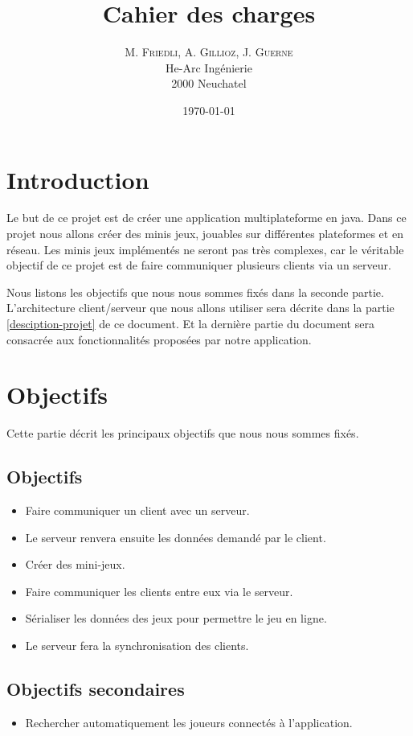 \documentclass{report}
\title{Cahier des charges}
\author{M. \textsc{Friedli}, A. \textsc{Gillioz}, J. \textsc{Guerne}\\
He-Arc Ingénierie\\
2000 Neuchatel}
\date{\today{}}
\begin{document}
\maketitle{}
\chapter{Introduction}
Le but de ce projet est de créer une application multiplateforme en java. Dans ce projet nous allons créer des minis jeux, jouables sur différentes plateformes et en réseau. Les minis jeux implémentés
ne seront pas très complexes, car le véritable objectif de ce projet est de faire communiquer plusieurs clients via un serveur.\par
Nous listons les objectifs que nous nous sommes fixés dans la seconde partie. L'architecture client/serveur que nous allons utiliser sera décrite dans la partie \ref{desciption-projet} de ce document.
Et la dernière partie du document sera consacrée aux fonctionnalités proposées par notre application.
\chapter{Objectifs}
Cette partie décrit les principaux objectifs que nous nous sommes fixés.
\section{Objectifs}\label{objectifs}
\begin{itemize}
	\item Faire communiquer un client avec un serveur.
	\item Le serveur renvera ensuite les données demandé par le client.
	\item Créer des mini-jeux.
	\item Faire communiquer les clients entre eux via le serveur.
	\item Sérialiser les données des jeux pour permettre le jeu en ligne.
	\item Le serveur fera la synchronisation des clients.
\end{itemize}
\section{Objectifs secondaires}\label{objectifs-secondaires}
\begin{itemize}
	\item Rechercher automatiquement les joueurs connectés à l'application.
\end{itemize}
\end{document}
